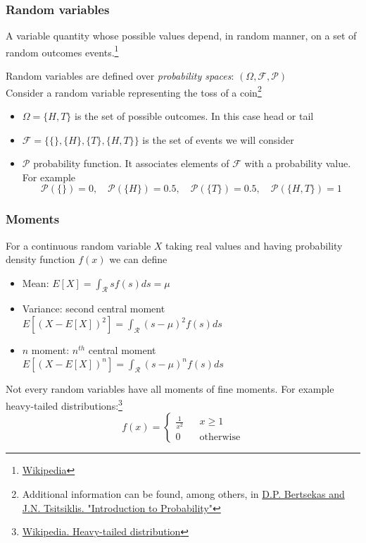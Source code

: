 \begin{frame}
	\frametitle{Random variables}
	A variable quantity whose possible values depend, in random manner, on a set of random outcomes events.\footnote{\href{https://en.wikipedia.org/wiki/Random_variable}{Wikipedia}}\vspace{2em}
	
	Random variables are defined over \emph{probability spaces}: $(\Omega, \mathcal{F}, \mathcal{P})$\\
	Consider a random variable representing the toss of a coin\footnote{Additional information can be found, among others, in \href{http://vfu.bg/en/e-Learning/Math--Bertsekas_Tsitsiklis_Introduction_to_probability.pdf}{D.P. Bertsekas and J.N. Tsitsiklis. "Introduction to Probability"}}
	\begin{itemize}
		\item $\Omega=\{H, T\}$ is the set of possible outcomes. In this case head or tail
		\item $\mathcal{F}=\{\{\}, \{H\}, \{T\}, \{H,T\}\}$ is the set of events we will consider
		\item $\mathcal{P}$ probability function. It associates elements of $\mathcal{F}$ with a probability value. For example $$\mathcal{P}(\{\})=0,\quad\mathcal{P}(\{H\})=0.5, \quad\mathcal{P}(\{T\})=0.5, \quad \mathcal{P}(\{H, T\})=1$$
	\end{itemize}
\end{frame}

\begin{frame}
	\frametitle{Moments}
	For a continuous random variable $X$ taking real values and having probability density function $f(x)$ we can define
	\begin{itemize}
		\item Mean: $E[X]=\int_\mathcal{R} sf(s)ds=\mu$
		\item Variance: second central moment $E[(X-E[X])^2]=\int_\mathcal{R} (s-\mu)^2f(s)ds$
		\item $n$ moment: $n^{th}$ central moment $E[(X-E[X])^n]=\int_\mathcal{R} (s-\mu)^nf(s)ds$
	\end{itemize}
	
	\vspace{1em}
	Not every random variables have all moments of fine moments. For example heavy-tailed distributions:\footnote{\href{https://en.wikipedia.org/wiki/Heavy-tailed_distribution}{\small{ Wikipedia. Heavy-tailed distribution}}} 
	$$f(x)=\left\{\begin{aligned}
					\frac{1}{x^2} && x \geq 1\\
					0&&\textrm{otherwise}
				   \end{aligned}
	\right.$$
\end{frame}

